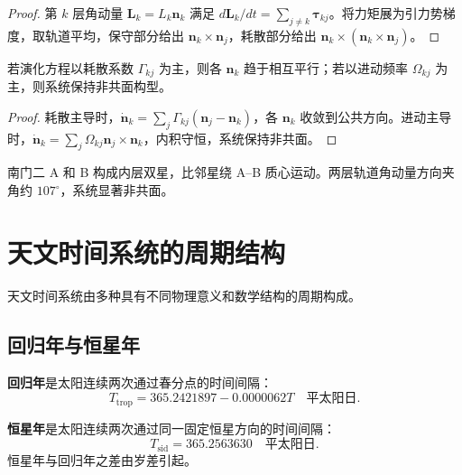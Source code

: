 \begin{proof}
第 \(k\) 层角动量 \(\mathbf L_k=L_k\mathbf n_k\) 满足 \(d\mathbf L_k/dt=\sum_{j\neq k}\boldsymbol\tau_{kj}\)。将力矩展为引力势梯度，取轨道平均，保守部分给出 \(\mathbf n_k\times\mathbf n_j\)，耗散部分给出 \(\mathbf n_k\times(\mathbf n_k\times\mathbf n_j)\)。
\end{proof}

\begin{corollary}[耗散主导下的轴对齐]\label{cor:dynamic_axis_alignment}
若演化方程以耗散系数 \(\Gamma_{kj}\) 为主，则各 \(\mathbf n_k\) 趋于相互平行；若以进动频率 \(\Omega_{kj}\) 为主，则系统保持非共面构型。
\end{corollary}

\begin{proof}
耗散主导时，\(\dot{\mathbf n}_k=\sum_j\Gamma_{kj}(\mathbf n_j-\mathbf n_k)\)，各 \(\mathbf n_k\) 收敛到公共方向。进动主导时，\(\dot{\mathbf n}_k=\sum_j\Omega_{kj}\mathbf n_j\times\mathbf n_k\)，内积守恒，系统保持非共面。
\end{proof}

\begin{example}[南门二三合星系统]
南门二 A 和 B 构成内层双星，比邻星绕 A--B 质心运动。两层轨道角动量方向夹角约 \(107^\circ\)，系统显著非共面。
\end{example}

\section{天文时间系统的周期结构}
\label{sec:astro_time_systems}

天文时间系统由多种具有不同物理意义和数学结构的周期构成。

\subsection{回归年与恒星年}

\begin{definition}[回归年]\label{def:tropical_year}
\textbf{回归年}是太阳连续两次通过春分点的时间间隔：
\[
T_{\text{trop}}=365.2421897-0.0000062T\quad\text{平太阳日}.
\]
\end{definition}

\begin{definition}[恒星年]\label{def:sidereal_year}
\textbf{恒星年}是太阳连续两次通过同一固定恒星方向的时间间隔：
\[
T_{\text{sid}}=365.2563630\quad\text{平太阳日}.
\]
恒星年与回归年之差由岁差引起。
\end{definition}

